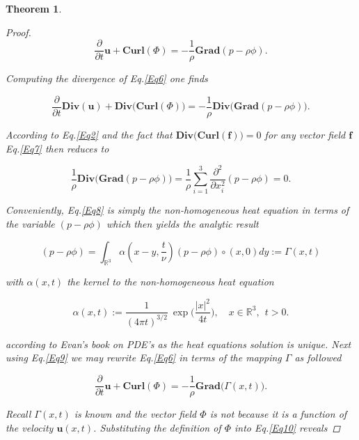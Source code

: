 \documentclass[amsmath,12pt,a4paper]{amsart}
\newtheorem{theorem}{Theorem}
\begin{document}
\begin{theorem}
\begin{proof}
\begin{equation}\label{Eq6}
\dfrac{\partial }{\partial t} \textbf{u}+\textbf{Curl}(\Phi) = -\dfrac{1}{\rho}  \textbf{Grad}(p - \rho \phi).
\end{equation}

Computing the divergence of Eq.\eqref{Eq6} one finds


\begin{equation}\label{Eq7}
\dfrac{\partial }{\partial t} \textbf{Div}(\textbf{u})+\textbf{Div}\big(\textbf{Curl}(\Phi)\big) = -\dfrac{1}{\rho}  \textbf{Div}\big(\textbf{Grad}(p - \rho \phi)\big).
\end{equation}

According to Eq.\eqref{Eq2} and the fact that $\textbf{Div}\big(\textbf{Curl}(\textbf{f})\big) = 0$ for any vector field $\textbf{f}$ Eq.\eqref{Eq7} then reduces to 


\begin{equation}\label{Eq8}
\dfrac{1}{\rho}  \textbf{Div}\big(\textbf{Grad}(p - \rho \phi)\big)= \dfrac{1}{\rho}\sum_{i=1}^{3}{\dfrac{\partial^2}{\partial x_i^2} (p - \rho \phi)} = 0  .
\end{equation}

Conveniently, Eq.\eqref{Eq8} is simply the non-homogeneous heat equation in terms of the variable $(p - \rho \phi)$ which then yields the analytic result


\begin{equation}\label{Eq9}
(p - \rho \phi) = \int_{\mathbb{R}^3}^{}{\alpha(x-y,\dfrac{t}{\nu})(p - \rho \phi)\circ(x,0)}dy:= \Gamma(x,t)
\end{equation}

with $\alpha(x,t)$ the kernel to the non-homogeneous heat equation 

$$
\alpha(x,t):= \dfrac{1}{(4\pi t)^{3/2}}~ \exp\biggl(\dfrac{|x|^2}{4t}\biggr), \quad x\in \mathbb{R}^3,~~ t>0.$$

according to Evan's book on PDE's \cite[p.~48]{Evans2022} as the heat equations solution is unique. Next using Eq.\eqref{Eq9} we may rewrite Eq.\eqref{Eq6} in terms of the mapping $\Gamma$ as followed


\begin{equation}\label{Eq10}
\dfrac{\partial }{\partial t} \textbf{u}+\textbf{Curl}(\Phi) = -\dfrac{1}{\rho}  \textbf{Grad}\big(\Gamma(x,t)\big).
\end{equation}

Recall $\Gamma(x,t)$ is known and the vector field $\Phi$ is not because it is a function of the velocity $\textbf{u}(x,t)$. Substituting the definition of $\Phi$ into Eq.\eqref{Eq10} reveals
 

\end{proof}
\end{theorem}
\end{document}
